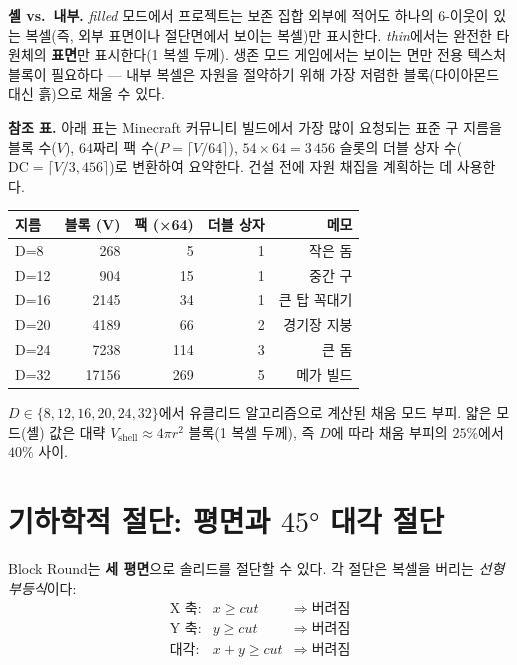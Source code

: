 \documentclass[12pt,a4paper]{scrartcl}
\newcommand{\acc}[1]{\textcolor{accent}{\textbf{#1}}}
\begin{document}
\textbf{셸 vs.\ 내부.} \emph{filled} 모드에서 프로젝트는 보존 집합 외부에 적어도 하나의 6-이웃이 있는 복셀(즉, 외부 표면이나 절단면에서 보이는 복셀)만 표시한다. \emph{thin}에서는 완전한 타원체의 \acc{표면}만 표시한다(1 복셀 두께). 생존 모드 게임에서는 보이는 면만 전용 텍스처 블록이 필요하다 — 내부 복셀은 자원을 절약하기 위해 가장 저렴한 블록(다이아몬드 대신 흙)으로 채울 수 있다.

\begin{minec}
\textbf{참조 표.} 아래 표는 Minecraft 커뮤니티 빌드에서 가장 많이 요청되는 표준 구 지름을 블록 수($V$), $64$짜리 팩 수($P=\lceil V/64\rceil$), $54 \times 64 = 3\,456$ 슬롯의 더블 상자 수($\mathrm{DC}=\lceil V/3{,}456 \rceil$)로 변환하여 요약한다. 건설 전에 자원 채집을 계획하는 데 사용한다.
\end{minec}

\vspace{0.5em}
\begin{center}
\begin{tabular}{@{}lrrrr@{}}
\toprule
\textbf{지름} & \textbf{블록 (V)} & \textbf{팩 (×64)} & \textbf{더블 상자} & \textbf{메모} \\
\midrule
D=8   &   268 &  5  & 1 & 작은 돔  \\
D=12  &   904 & 15  & 1 & 중간 구 \\
D=16  &  2145 & 34  & 1 & 큰 탑 꼭대기 \\
D=20  &  4189 & 66  & 2 & 경기장 지붕 \\
D=24  &  7238 & 114 & 3 & 큰 돔 \\
D=32  & 17156 & 269 & 5 & 메가 빌드 \\
\bottomrule
\end{tabular}
\end{center}

$D \in \{8,12,16,20,24,32\}$에서 유클리드 알고리즘으로 계산된 채움 모드 부피. 얇은 모드(셸) 값은 대략 $V_{\mathrm{shell}} \approx 4\pi r^2$ 블록(1 복셀 두께), 즉 $D$에 따라 채움 부피의 $25\%$에서 $40\%$ 사이.

\section{기하학적 절단: 평면과 $45°$ 대각 절단}

Block Round는 \acc{세 평면}으로 솔리드를 절단할 수 있다. 각 절단은 복셀을 버리는 \emph{선형 부등식}이다:
\[
\begin{array}{lcl}
\text{X 축:}    & x \geq \mathit{cut}      & \Rightarrow\; \text{버려짐} \\
\text{Y 축:}    & y \geq \mathit{cut}      & \Rightarrow\; \text{버려짐} \\
\text{대각:}  & x + y \geq \mathit{cut}  & \Rightarrow\; \text{버려짐}
\end{array}
\]
\end{document}
